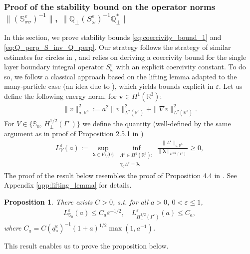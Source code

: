 \documentclass[]{article}
\newtheorem{proposition}{Proposition}
\numberwithin{equation}{section}
\numberwithin{theorem}{section}
\numberwithin{lemma}{section}
\numberwithin{corollary}{section}
\numberwithin{proposition}{section}
\numberwithin{definition}{section}
\newcommand{\re}{\varepsilon}
\renewcommand{\vec}{\boldsymbol}
\begin{document}
	\subsubsection{Proof of the stability bound on the operator norms $\| (\mathbb{S}^{\re}_{\sigma \sigma})^{-1} \|$, $\| \mathbb{Q}_{\perp} (S^{\re}_{\omega})^{-1} \mathbb{Q}^*_{\perp} \|$}
	\label{sec:coercivity_bound}
	In this section, we prove stability bounds \eqref{eq:coercivity_bound_1} and \eqref{eq:Q_perp_S_inv_Q_perp}. Our strategy follows the strategy of similar estimates for circles in \cite{MK}, and relies on deriving a coercivity bound for the single layer boundary integral operator $S^{\re}_{\omega}$ with an explicit coercivity constant. To do so, we follow a classical approach based on the lifting lemma adapted to the many-particle case (an idea due to \cite{hassan_stamm}), which yields bounds explicit in $\re$. Let us define the following energy norm, for $\vec{v}\in H^1(\mathbb{R}^3)$:
	\begin{align}%
		\label{eq:energy_norm}
		\|{v}\|_{a, \mathbb{R}^3}^2:=a^2\|v\|^2_{L^2(\mathbb{R}^3)}+\|\nabla v\|_{L^2(\mathbb{R}^3)}^2.
	\end{align}
	For $V\in \{\mathbb{S}_0, \, H^{1/2}_{\perp}(\Gamma^{\re})\}$ we define the quantity (well-defined by the same argument as in proof of Proposition 2.5.1 in \cite{sayas})
	\begin{align}
		\label{eq:lva}
		L_V^{\re}(a):=\sup\limits_{\vec{\lambda}\in V\setminus\{0\}}\inf_{\substack{\Lambda^{\re} \in H^1(\mathbb{R}^3): \\  \gamma_0\Lambda^{\re}=\vec{\lambda}}}  \frac{\| \Lambda^{\re} \|_{a,\mathbb{R}^3}}{\| \vec{\lambda} \|_{H^{1/2}(\Gamma^{\re})}}\geq 0,
	\end{align}
	The proof of the result below resembles the proof of Proposition 4.4 in \cite{MK}. See Appendix \ref{app:lifting_lemma} for details.
	\begin{proposition}
		\label{prop:lifting_lemma}
		There exists $C>0$, s.t. for all $a>0$,  $0<\re\leq 1$,
		\begin{align*}%
			L_{\mathbb{S}_0}^{\re}(a)\leq C_a \re^{-1/2} ,\quad 
			L_{H^{1/2}_{\perp}(\Gamma^{\re})}^{\re}(a)\leq C_a,
		\end{align*}
		where $C_a=C(\underline{d}^{\re}_*)^{-1} (1+a)^{1/2} \max(1, a^{-1})$.
	\end{proposition}
	This result enables us to prove the proposition below.
	
\end{document}
